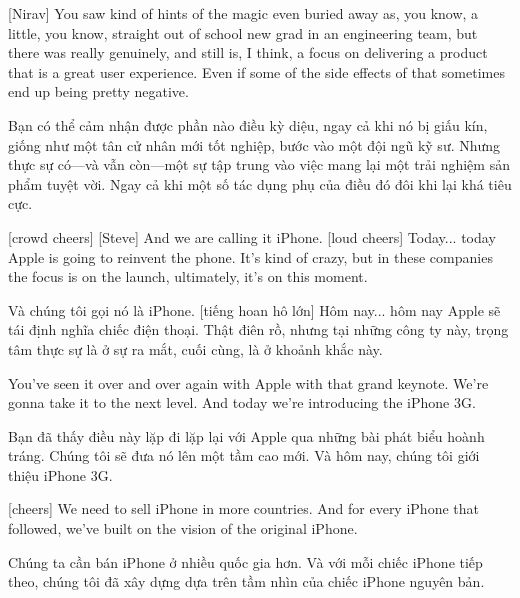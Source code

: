 \documentclass[a4paper]{article}
\begin{document}
	[Nirav] You saw kind of hints of the magic even buried away as, you know, a little, you know, straight out of school new grad in an engineering team, but there was really genuinely, and still is, I think, a focus on delivering a product that is a great user experience.
	Even if some of the side effects of that sometimes end up being pretty negative.
	
	\begin{vietnamese-v2}
		[Nirav] Bạn có thể cảm nhận được phần nào điều kỳ diệu, ngay cả khi nó bị giấu kín, giống như một tân cử nhân mới tốt nghiệp, bước vào một đội ngũ kỹ sư. Nhưng thực sự có—và vẫn còn—một sự tập trung vào việc mang lại một trải nghiệm sản phẩm tuyệt vời. Ngay cả khi một số tác dụng phụ của điều đó đôi khi lại khá tiêu cực.
	\end{vietnamese-v2}
	
	
	[crowd cheers]
	[Steve] And we are calling it iPhone.
	[loud cheers]
	Today...
	today Apple is going to reinvent the phone.
	It's kind of crazy, but in these companies the focus is on the launch, ultimately, it's on this moment.
	
	\begin{vietnamese-v2}
		 Và chúng tôi gọi nó là iPhone.  
		[tiếng hoan hô lớn]  
		Hôm nay...  
		hôm nay Apple sẽ tái định nghĩa chiếc điện thoại.  
		Thật điên rồ, nhưng tại những công ty này, trọng tâm thực sự là ở sự ra mắt, cuối cùng, là ở khoảnh khắc này.
	\end{vietnamese-v2}
	
	You've seen it over and over again with Apple with that grand keynote.
	We're gonna take it to the next level.
	And today we're introducing the iPhone 3G.
	
	\begin{vietnamese-v2}
		Bạn đã thấy điều này lặp đi lặp lại với Apple qua những bài phát biểu hoành tráng.  
		Chúng tôi sẽ đưa nó lên một tầm cao mới.  
		Và hôm nay, chúng tôi giới thiệu iPhone 3G.
	\end{vietnamese-v2}

	[cheers]
	We need to sell iPhone in more countries. And for every iPhone that followed, we've built on the vision of the original iPhone.
	
	\begin{vietnamese-v2}
		Chúng ta cần bán iPhone ở nhiều quốc gia hơn. Và với mỗi chiếc iPhone tiếp theo, chúng tôi đã xây dựng dựa trên tầm nhìn của chiếc iPhone nguyên bản.
	\end{vietnamese-v2}
	
\end{document}

